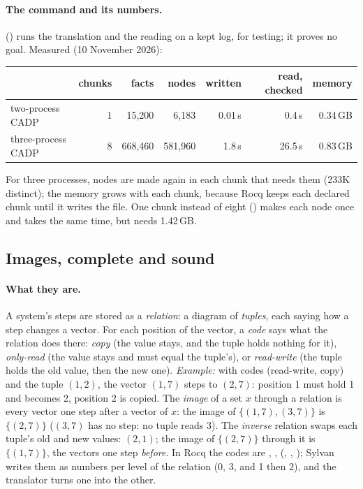 \paragraph{The command and its numbers.} 
() runs the translation and the reading on a
kept log, for testing; it proves no goal. Measured (10 November 2026):

\begin{center}
\small
\begin{tabular}{@{}lrrrrrr@{}}
\toprule
 & chunks & facts & nodes & written & read, checked & memory \\
\midrule
two-process CADP & 1 & 15,200 & 6,183 & 0.01\,s & 0.4\,s & 0.34\,GB \\
three-process CADP & 8 & 668,460 & 581,960 & 1.8\,s & 26.5\,s & 0.83\,GB \\
\bottomrule
\end{tabular}
\end{center}

For three processes, nodes are made again in each chunk that needs them
(233K distinct); the memory grows with each chunk, because Rocq keeps each
declared chunk until it writes the  file. One chunk instead of
eight () makes each node once and takes the same
time, but needs 1.42\,GB.

\subsection{Images, complete and sound}\label{sec:prooflog:images}

\paragraph{What they are.} A system's steps are stored as a
\emph{relation}: a diagram of \emph{tuples}, each saying how a step
changes a vector. For each position of the vector, a \emph{code} says what
the relation does there: \emph{copy} (the value stays, and the tuple holds
nothing for it), \emph{only-read} (the value stays and must equal the
tuple's), or \emph{read-write} (the tuple holds the old value, then the new
one). \emph{Example:} with codes (read-write, copy) and the tuple
$(1, 2)$, the vector $(1, 7)$ steps to $(2, 7)$: position 1 must hold 1 and
becomes 2, position 2 is copied. The \emph{image} of a set $x$ through a
relation is every vector one step after a vector of $x$: the image of
$\{(1,7), (3,7)\}$ is $\{(2,7)\}$ ($(3,7)$ has no step: no tuple reads
3). The \emph{inverse} relation swaps each tuple's old and new values:
$(2, 1)$; the image of $\{(2,7)\}$ through it is $\{(1,7)\}$, the vectors
one step \emph{before}. In Rocq the codes are , ,
 (, ,
); Sylvan writes them as numbers per level of
the relation (0, 3, and 1 then 2), and the translator turns one into the
other.

